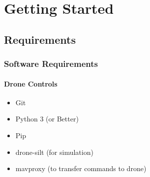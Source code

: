 \chapter{Getting Started}

\section{Requirements}
\subsection{Software Requirements}
\subsubsection{Drone Controls}
\begin{itemize}
    \item Git
    \item Python 3 (or Better)
    \item Pip
    \item drone-silt (for simulation) \cite{dronekit}
    \item mavproxy (to transfer commands to drone) \cite{mavproxy}
\end{itemize}